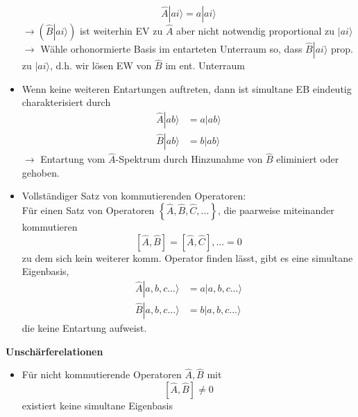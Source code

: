 \documentclass[10pt,article,colorback,accentcolor=tud9d]{scrartcl}
\begin{document}
\begin{fleqn}
\begin{itemize}
      \begin{equation}
      \hat{A}\left.\right|ai\rangle =a\left.\right|ai\rangle
      \end{equation}
      $\rightarrow \left(\hat{B}\left.\right|ai\rangle\right)$ ist weiterhin EV zu $\hat{A}$ aber nicht notwendig proportional zu $\left.\right|ai\rangle$\\
      $\rightarrow$ Wähle orhonormierte Basis im entarteten Unterraum so, dass $\hat{B}\left.\right|ai\rangle$ prop. zu $\left.\right|ai\rangle$, d.h. wir lösen EW von $\hat{B}$ im ent. Unterraum
    \item Wenn keine weiteren Entartungen auftreten, dann ist simultane EB eindeutig charakterisiert durch 
      \begin{equation}
      \begin{aligned}
        \hat{A}\left.\right|ab\rangle&=a\left.\right|ab\rangle\\
        \hat{B}\left.\right|ab\rangle&=b\left.\right|ab\rangle
      \end{aligned}
      \end{equation}
      $\rightarrow$ Entartung vom $\hat{A}$-Spektrum durch Hinzunahme von $\hat{B}$ eliminiert oder gehoben.
    \item Vollständiger Satz von kommutierenden Operatoren:\\
      Für einen Satz von Operatoren $\left\{\hat{A},\hat{B},\hat{C},...\right\}$, die paarweise miteinander kommutieren
      \begin{equation}
      \left[\hat{A},\hat{B}\right]=\left[\hat{A},\hat{C}\right],...=0
      \end{equation}
      zu dem sich kein weiterer komm. Operator finden lässt, gibt es eine simultane Eigenbasis, 
      \begin{equation}
      \begin{aligned}
        \hat{A}\left.\right|a,b,c...\rangle&=a\left.\right|a,b,c...\rangle\\
        \hat{B}\left.\right|a,b,c...\rangle&=b\left.\right|a,b,c...\rangle
      \end{aligned}
      \end{equation}
      die keine Entartung aufweist.
  \end{itemize}
\textbf{Unschärferelationen}
  \begin{itemize}
    \item Für nicht kommutierende Operatoren $\hat{A},\hat{B}$ mit 
      $$
      \left[\hat{A},\hat{B}\right]\neq 0
      $$
      existiert keine simultane Eigenbasis

\end{itemize}
\end{fleqn}
\end{document}
